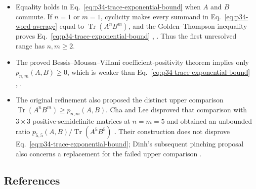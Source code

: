 \begin{itemize}
  \item Equality holds in Eq.~\eqref{eq:p34-trace-exponential-bound} when
  $A$ and $B$ commute.  If $n=1$ or $m=1$, cyclicity makes every summand in
  Eq.~\eqref{eq:p34-word-average} equal to
  $\operatorname{Tr}(A^nB^m)$, and the Golden--Thompson inequality proves
  Eq.~\eqref{eq:p34-trace-exponential-bound}
  ,
  .  Thus the first unresolved range has
  $n,m\geq2$.

  \item The proved Bessis--Moussa--Villani coefficient-positivity theorem
  implies only $p_{n,m}(A,B)\geq0$, which is weaker than
  Eq.~\eqref{eq:p34-trace-exponential-bound}
  ,
  .

  \item The original refinement also proposed the distinct upper comparison
  $\operatorname{Tr}(A^nB^m)\geq p_{n,m}(A,B)$.  Cha and Lee disproved that
  comparison with $3\times3$ positive-semidefinite matrices at $n=m=5$ and
  obtained an unbounded ratio
  $p_{5,5}(A,B)/\operatorname{Tr}(A^5B^5)$
  .  Their construction does not disprove
  Eq.~\eqref{eq:p34-trace-exponential-bound}; Dinh's subsequent pinching
  proposal also concerns a replacement for the failed upper comparison
  .
\end{itemize}

\subsection*{References}


